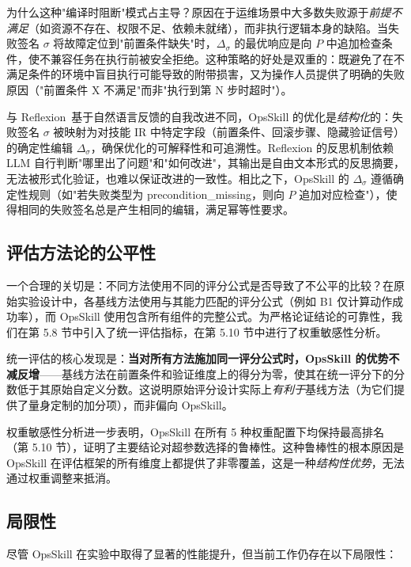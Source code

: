 \documentclass[11pt,a4paper]{ctexart}
\begin{document}
为什么这种"编译时阻断"模式占主导？原因在于运维场景中大多数失败源于\emph{前提不满足}（如资源不存在、权限不足、依赖未就绪），而非执行逻辑本身的缺陷。当失败签名 $\sigma$ 将故障定位到"前置条件缺失"时，$\Delta_\sigma$ 的最优响应是向 $P$ 中追加检查条件，使不兼容任务在执行前被安全拒绝。这种策略的好处是双重的：既避免了在不满足条件的环境中盲目执行可能导致的附带损害，又为操作人员提供了明确的失败原因（"前置条件 X 不满足"而非"执行到第 N 步时超时"）。

与 Reflexion~\cite{shinn2023reflexion}基于自然语言反馈的自我改进不同，OpsSkill 的优化是\emph{结构化}的：失败签名 $\sigma$ 被映射为对技能 IR 中特定字段（前置条件、回滚步骤、隐藏验证信号）的确定性编辑 $\Delta_\sigma$，确保优化的可解释性和可追溯性。Reflexion 的反思机制依赖 LLM 自行判断"哪里出了问题"和"如何改进"，其输出是自由文本形式的反思摘要，无法被形式化验证，也难以保证改进的一致性。相比之下，OpsSkill 的 $\Delta_\sigma$ 遵循确定性规则（如"若失败类型为 precondition\_missing，则向 $P$ 追加对应检查"），使得相同的失败签名总是产生相同的编辑，满足幂等性要求。

\subsection{评估方法论的公平性}

一个合理的关切是：不同方法使用不同的评分公式是否导致了不公平的比较？在原始实验设计中，各基线方法使用与其能力匹配的评分公式（例如 B1 仅计算动作成功率），而 OpsSkill 使用包含所有组件的完整公式。为严格论证结论的可靠性，我们在第 5.8 节中引入了统一评估指标，在第 5.10 节中进行了权重敏感性分析。

统一评估的核心发现是：\textbf{当对所有方法施加同一评分公式时，OpsSkill 的优势不减反增}——基线方法在前置条件和验证维度上的得分为零，使其在统一评分下的分数低于其原始自定义分数。这说明原始评分设计实际上\emph{有利于}基线方法（为它们提供了量身定制的加分项），而非偏向 OpsSkill。

权重敏感性分析进一步表明，OpsSkill 在所有 5 种权重配置下均保持最高排名（第 5.10 节），证明了主要结论对超参数选择的鲁棒性。这种鲁棒性的根本原因是 OpsSkill 在评估框架的所有维度上都提供了非零覆盖，这是一种\emph{结构性优势}，无法通过权重调整来抵消。

\subsection{局限性}

尽管 OpsSkill 在实验中取得了显著的性能提升，但当前工作仍存在以下局限性：
\end{document}
